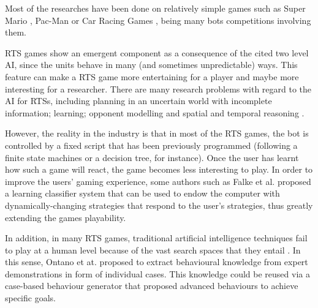 \documentclass{llncs}
\begin{document}
Most of the researches have been done on relatively simple games such
as Super Mario \cite{Togelius_SuperMario}, Pac-Man
\cite{Pac-MAnt_CIG2010} or Car Racing Games \cite{CarRacing_Pelta09},
being many bots competitions involving them. %

RTS games show an emergent component \cite{emergence_in_games2008} as a consequence of the cited two level AI, since the units behave in many  %
(and sometimes unpredictable) ways. This feature can make a RTS game more entertaining for a player and maybe more interesting for a researcher.
There are many research problems with regard to the AI for RTSs, %
including planning in an uncertain world with incomplete information;
learning; opponent modelling and spatial and temporal reasoning
\cite{hongchoCIG2005}. 

However, the reality in the industry is that in most of the RTS games,
the bot is  controlled by a fixed script that has been previously
programmed (following a finite state machines or a decision tree, for
instance). %
Once the user has learnt how such a game will react, the game
becomes less interesting to play. In order to improve the users' gaming
experience, some authors such as Falke et al. \cite{falke2003} proposed a learning classifier system that can be used to endow the computer with
dynamically-changing %
strategies that respond to the user's strategies,
thus greatly extending the games playability. %

In addition, in many RTS games, traditional artificial intelligence techniques fail to play at a human level because of the vast search spaces that they entail \cite{Aha05learningtowin}. In this sense, Ontano et at. \cite{ontanon2007} proposed to extract behavioural knowledge from expert demonstrations in form of individual cases. This knowledge could be reused via a case-based behaviour
generator that proposed advanced behaviours to achieve specific
goals. %
\end{document}
